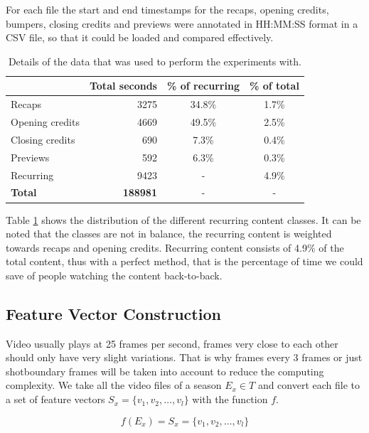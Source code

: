 \documentclass{article}
\begin{document}
For each file the start and end timestamps for the recaps, opening credits, bumpers, closing credits and previews were annotated in HH:MM:SS format in a CSV file, so that it could be loaded and compared effectively.

\begin{table}[h]
	\begin{adjustwidth}{-.5in}{-.5in}  
		\begin{center}
			\begin{tabular}{ l | r c c}
								& Total seconds & \% of recurring 	& \% of total \\
				\hline
				Recaps 			& 3275 			& 34.8\% 			& 1.7\% \\
				Opening credits	& 4669			& 49.5\%			& 2.5\%	\\
				Closing credits	& 690			& 7.3\%				& 0.4\%	\\
				Previews		& 592			& 6.3\%				& 0.3\% \\
				\hline
				Recurring		& 9423			& -					& 4.9\% \\
				\textbf{Total}	& \textbf{188981}		& -					& -
			\end{tabular}
		\end{center}
	\end{adjustwidth}
	\caption{Details of the data that was used to perform the experiments with.}
	\label{table:datastatistics}
\end{table}

Table \ref{table:datastatistics} shows the distribution of the different recurring content classes. It can be noted that the classes are not in balance, the recurring content is weighted towards recaps and opening credits. Recurring content consists of 4.9\% of the total content, thus with a perfect method, that is the percentage of time we could save of people watching the content back-to-back.

\subsection{Feature Vector Construction}
Video usually plays at 25 frames per second, frames very close to each other should only have very slight variations. That is why frames every 3 frames or just shotboundary frames will be taken into account to reduce the computing complexity. We take all the video files of a season $E_x \in T$ and convert each file to a set of feature vectors $S_x = \{v_1, v_2, \dots, v_l\}$ with the function $f$.

\[f(E_x) = S_x = \{v_1, v_2, \dots, v_l\}\]
\end{document}
